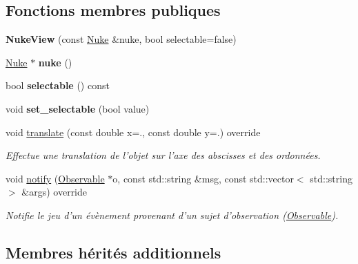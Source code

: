 \subsection*{Fonctions membres publiques}
\begin{DoxyCompactItemize}
\item 
\hypertarget{classNukeView_a9bb87e648efa96308058a68748e53a41}{{\bfseries Nuke\+View} (const \hyperlink{classNuke}{Nuke} \&nuke, bool selectable=false)}\label{classNukeView_a9bb87e648efa96308058a68748e53a41}

\item 
\hypertarget{classNukeView_a8bf8e524e5627138ed6c028cb4b87d2b}{\hyperlink{classNuke}{Nuke} $\ast$ {\bfseries nuke} ()}\label{classNukeView_a8bf8e524e5627138ed6c028cb4b87d2b}

\item 
\hypertarget{classNukeView_a70589619df5713cadcc47f399fae6e00}{bool {\bfseries selectable} () const }\label{classNukeView_a70589619df5713cadcc47f399fae6e00}

\item 
\hypertarget{classNukeView_ab3761858ebbe1f6dcde7813c4118bfd0}{void {\bfseries set\+\_\+selectable} (bool value)}\label{classNukeView_ab3761858ebbe1f6dcde7813c4118bfd0}

\item 
void \hyperlink{classNukeView_ab5743729fc4659e2cd670d42800c9856}{translate} (const double x=., const double y=.) override
\begin{DoxyCompactList}\small\item\em Effectue une translation de l’objet sur l’axe des abscisses et des ordonnées. \end{DoxyCompactList}\item 
void \hyperlink{classNukeView_af45ef374496a0ef5b3d595ab1e5fba20}{notify} (\hyperlink{classObservable}{Observable} $\ast$o, const std\+::string \&msg, const std\+::vector$<$ std\+::string $>$ \&args) override
\begin{DoxyCompactList}\small\item\em Notifie le jeu d'un évènement provenant d'un sujet d'observation (\hyperlink{classObservable}{Observable}). \end{DoxyCompactList}\end{DoxyCompactItemize}
\subsection*{Membres hérités additionnels}


